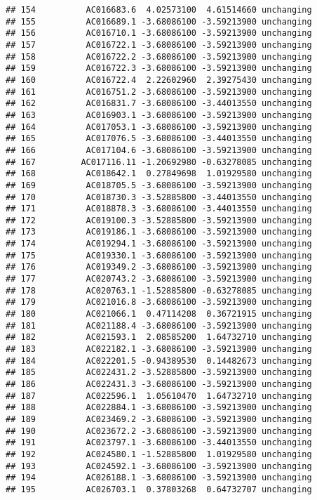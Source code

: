 \documentclass[]{article}
\begin{document}
\begin{verbatim}
## 154          AC016683.6  4.02573100  4.61514660 unchanging
## 155          AC016689.1 -3.68086100 -3.59213900 unchanging
## 156          AC016710.1 -3.68086100 -3.59213900 unchanging
## 157          AC016722.1 -3.68086100 -3.59213900 unchanging
## 158          AC016722.2 -3.68086100 -3.59213900 unchanging
## 159          AC016722.3 -3.68086100 -3.59213900 unchanging
## 160          AC016722.4  2.22602960  2.39275430 unchanging
## 161          AC016751.2 -3.68086100 -3.59213900 unchanging
## 162          AC016831.7 -3.68086100 -3.44013550 unchanging
## 163          AC016903.1 -3.68086100 -3.59213900 unchanging
## 164          AC017053.1 -3.68086100 -3.59213900 unchanging
## 165          AC017076.5 -3.68086100 -3.44013550 unchanging
## 166          AC017104.6 -3.68086100 -3.59213900 unchanging
## 167         AC017116.11 -1.20692980 -0.63278085 unchanging
## 168          AC018642.1  0.27849698  1.01929580 unchanging
## 169          AC018705.5 -3.68086100 -3.59213900 unchanging
## 170          AC018730.3 -3.52885800 -3.44013550 unchanging
## 171          AC018878.3 -3.68086100 -3.44013550 unchanging
## 172          AC019100.3 -3.52885800 -3.59213900 unchanging
## 173          AC019186.1 -3.68086100 -3.59213900 unchanging
## 174          AC019294.1 -3.68086100 -3.59213900 unchanging
## 175          AC019330.1 -3.68086100 -3.59213900 unchanging
## 176          AC019349.2 -3.68086100 -3.59213900 unchanging
## 177          AC020743.2 -3.68086100 -3.59213900 unchanging
## 178          AC020763.1 -1.52885800 -0.63278085 unchanging
## 179          AC021016.8 -3.68086100 -3.59213900 unchanging
## 180          AC021066.1  0.47114208  0.36721915 unchanging
## 181          AC021188.4 -3.68086100 -3.59213900 unchanging
## 182          AC021593.1  2.08585200  1.64732710 unchanging
## 183          AC022182.1 -3.68086100 -3.59213900 unchanging
## 184          AC022201.5 -0.94389530  0.14482673 unchanging
## 185          AC022431.2 -3.52885800 -3.59213900 unchanging
## 186          AC022431.3 -3.68086100 -3.59213900 unchanging
## 187          AC022596.1  1.05610470  1.64732710 unchanging
## 188          AC022884.1 -3.68086100 -3.59213900 unchanging
## 189          AC023469.2 -3.68086100 -3.59213900 unchanging
## 190          AC023672.2 -3.68086100 -3.59213900 unchanging
## 191          AC023797.1 -3.68086100 -3.44013550 unchanging
## 192          AC024580.1 -1.52885800  1.01929580 unchanging
## 193          AC024592.1 -3.68086100 -3.59213900 unchanging
## 194          AC026188.1 -3.68086100 -3.59213900 unchanging
## 195          AC026703.1  0.37803268  0.64732707 unchanging

\end{verbatim}
\end{document}
